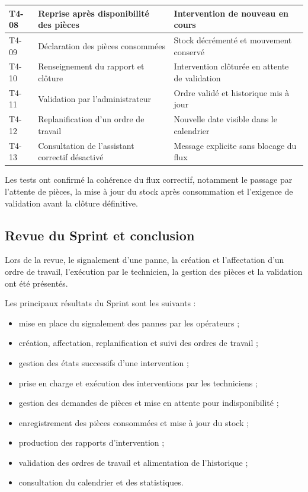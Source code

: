 {\begin{longtable}{|p{0.9cm}|>{\raggedright\arraybackslash}p{7cm}|>{\raggedright\arraybackslash}p{4.7cm}|}
T4-08 &
Reprise après disponibilité des pièces &
Intervention de nouveau en cours \\
\hline

T4-09 &
Déclaration des pièces consommées &
Stock décrémenté et mouvement conservé \\
\hline

T4-10 &
Renseignement du rapport et clôture &
Intervention clôturée en attente de validation \\
\hline

T4-11 &
Validation par l'administrateur &
Ordre validé et historique mis à jour \\
\hline

T4-12 &
Replanification d'un ordre de travail &
Nouvelle date visible dans le calendrier \\
\hline

T4-13 &
Consultation de l'assistant correctif désactivé &
Message explicite sans blocage du flux \\
\hline

\end{longtable}}

Les tests ont confirmé la cohérence du flux correctif, notamment le passage par l'attente de pièces, la mise à jour du stock après consommation et l'exigence de validation avant la clôture définitive.

\subsection{Revue du Sprint et conclusion}

Lors de la revue, le signalement d'une panne, la création et l'affectation d'un ordre de travail, l'exécution par le technicien, la gestion des pièces et la validation ont été présentés.

Les principaux résultats du Sprint sont les suivants :

\begin{itemize}
    \item mise en place du signalement des pannes par les opérateurs ;
    \item création, affectation, replanification et suivi des ordres de travail ;
    \item gestion des états successifs d'une intervention ;
    \item prise en charge et exécution des interventions par les techniciens ;
    \item gestion des demandes de pièces et mise en attente pour indisponibilité ;
    \item enregistrement des pièces consommées et mise à jour du stock ;
    \item production des rapports d'intervention ;
    \item validation des ordres de travail et alimentation de l'historique ;
    \item consultation du calendrier et des statistiques.
\end{itemize}

